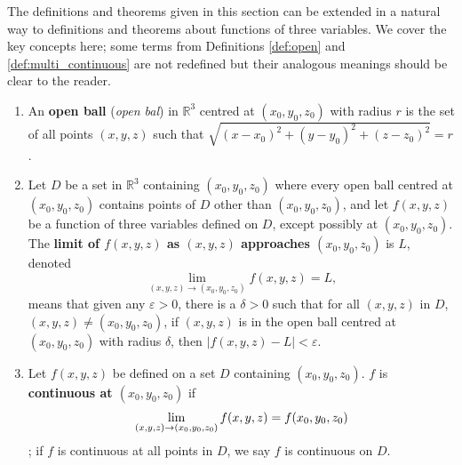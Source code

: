The definitions and theorems given in this section can be extended in a natural way to definitions and theorems about functions of three variables. We cover the key concepts here; some terms from Definitions \ref{def:open} and \ref{def:multi_continuous} are not redefined but their analogous meanings should be clear to the reader.


\begin{definition}\label{def:multi3defs}
\begin{enumerate}
\item An \textbf{open ball} (\textit{open bal}) in $\mathbb{R}^3$ centred at $(x_0,y_0,z_0)$ with radius $r$ is the set of all points $(x,y,z)$ such that $\sqrt{(x-x_0)^2+(y-y_0)^2+(z-z_0)^2} = r$.

\item Let $D$ be a set in $\mathbb{R}^3$ containing $(x_0,y_0,z_0)$ where every open ball centred at $(x_0,y_0,z_0)$ contains points of $D$ other than $(x_0,y_0,z_0)$, and let $f(x,y,z)$ be a function of three variables defined on $D$, except possibly at  $(x_0,y_0,z_0)$. The \textbf{limit of $f(x,y,z)$ as $(x,y,z)$ approaches $(x_0,y_0,z_0)$} is $L$, denoted 
$$\lim_{(x,y,z)\to (x_0,y_0,z_0)} f(x,y,z) = L,$$
means that given any $\varepsilon >0$, there is a $\delta >0$ such that for all  $(x,y,z)$ in $D$, $(x,y,z)\neq(x_0,y_0,z_0)$, if $(x,y,z)$ is in the open ball centred at $(x_0,y_0,z_0)$ with radius $\delta$, then $|f(x,y,z) - L|< \varepsilon$.\\

\item Let $f(x,y,z)$ be defined on a set $D$ containing $(x_0,y_0,z_0)$. $f$ is \textbf{continuous at $(x_0,y_0,z_0)$} if $$\displaystyle \lim_{(x,y,z)\to (x_0,y_0,z_0)} f(x,y,z) = f(x_0,y_0,z_0)$$; if $f$ is continuous at all points in $D$, we say $f$ is continuous on $D$.
\end{enumerate}
\end{definition}

\fi

%
%

